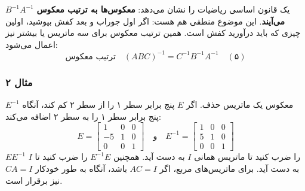 \documentclass[12pt, a4paper]{book}
\begin{document}
	$B^{-1}A^{-1}$ یک قانون اساسی ریاضیات را نشان می‌دهد: \textbf{معکوس‌ها به ترتیب معکوس می‌آیند}.
	این موضوع منطقی هم هست: اگر اول جوراب و بعد کفش بپوشید، اولین چیزی که باید درآورید کفش است. همین ترتیب معکوس برای سه ماتریس یا بیشتر نیز اعمال می‌شود:
	\[ \text{ترتیب معکوس} \quad (ABC)^{-1} = C^{-1}B^{-1}A^{-1} \quad (۵) \]
	
	\subsubsection*{مثال ۲}
	معکوس یک ماتریس حذف. اگر $E$ پنج برابر سطر ۱ را از سطر ۲ کم کند، آنگاه $E^{-1}$ پنج برابر سطر ۱ را به سطر ۲ اضافه می‌کند:
	\[ E = \begin{bmatrix} 1 & 0 & 0 \\ -5 & 1 & 0 \\ 0 & 0 & 1 \end{bmatrix} \quad \text{و} \quad E^{-1} = \begin{bmatrix} 1 & 0 & 0 \\ 5 & 1 & 0 \\ 0 & 0 & 1 \end{bmatrix} \]
	$EE^{-1}$ را ضرب کنید تا ماتریس همانی $I$ به دست آید. همچنین $E^{-1}E$ را ضرب کنید تا $I$ به دست آید. برای ماتریس‌های مربع، اگر $AC=I$ باشد، آنگاه به طور خودکار $CA=I$ نیز برقرار است.
	
\end{document}
